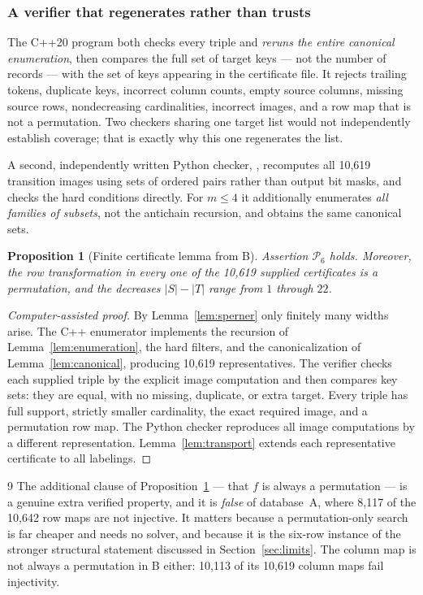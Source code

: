 \documentclass[11pt,letterpaper]{article}
\numberwithin{equation}{section}
\newtheorem{proposition}[theorem]{Proposition}
\theoremstyle{definition}
\theoremstyle{remark}
\newcommand{\code}[1]{\texttt{\detokenize{#1}}}
\newcommand{\dbA}{\textsf{A}}
\newcommand{\dbB}{\textsf{B}}
\begin{document}
\subsubsection{A verifier that regenerates rather than trusts}
The C++20 program \code{src/verify.cpp} both checks every triple and
\emph{reruns the entire canonical enumeration}, then compares the full set of
target keys --- not the number of records --- with the set of keys appearing
in the certificate file. It rejects trailing tokens, duplicate keys, incorrect
column counts, empty source columns, missing source rows, nondecreasing
cardinalities, incorrect images, and a row map that is not a permutation.
Two checkers sharing one target list would not independently establish
coverage; that is exactly why this one regenerates the list.

A second, independently written Python checker,
\code{tests/verify\_certificates.py}, recomputes all 10,619 transition images
using sets of ordered pairs rather than output bit masks, and checks the hard
conditions directly. For $m\le4$ it additionally enumerates \emph{all
families of subsets}, not the antichain recursion, and obtains the same
canonical sets.

\begin{proposition}[Finite certificate lemma from \dbB{}]\label{prop:finite}
Assertion $\mathcal P_6$ holds. Moreover, the row transformation in every one
of the 10,619 supplied certificates is a permutation, and the decreases
$|S|-|T|$ range from $1$ through $22$.
\end{proposition}
\begin{proof}[Computer-assisted proof]
By Lemma~\ref{lem:sperner} only finitely many widths arise. The C++
enumerator implements the recursion of Lemma~\ref{lem:enumeration}, the hard
filters, and the canonicalization of Lemma~\ref{lem:canonical}, producing
10,619 representatives. The verifier checks each supplied triple by the
explicit image computation and then compares key sets: they are equal, with no
missing, duplicate, or extra target. Every triple has full support, strictly
smaller cardinality, the exact required image, and a permutation row map. The
Python checker reproduces all image computations by a different
representation. Lemma~\ref{lem:transport} extends each representative
certificate to all labelings.
\end{proof}

\begin{variantbox}{9}
The additional clause of Proposition~\ref{prop:finite} --- that $f$ is always
a permutation --- is a genuine extra verified property, and it is
\emph{false} of database~\dbA{}, where 8,117 of the 10,642 row maps are not
injective. It matters because a permutation-only search is far cheaper and
needs no solver, and because it is the six-row instance of the stronger
structural statement discussed in Section~\ref{sec:limits}. The column map is
not always a permutation in \dbB{} either: 10,113 of its 10,619 column maps
fail injectivity.
\end{variantbox}
\end{document}
